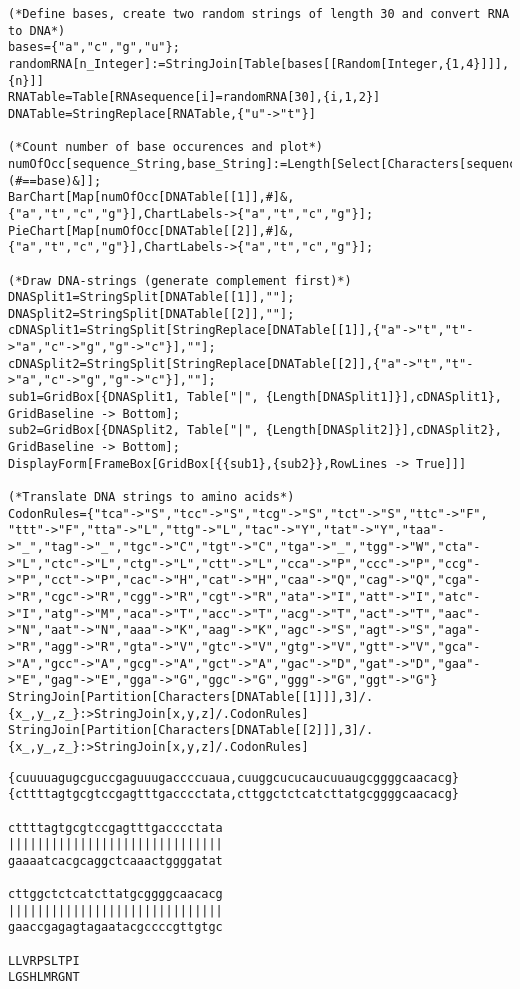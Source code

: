 \documentclass[11pt,a4paper,onecolumn]{article}
\begin{document}
\begin{lstlisting}[mathescape]
(*Define bases, create two random strings of length 30 and convert RNA to DNA*)
bases={"a","c","g","u"};
randomRNA[n_Integer]:=StringJoin[Table[bases[[Random[Integer,{1,4}]]],{n}]]
RNATable=Table[RNAsequence[i]=randomRNA[30],{i,1,2}]
DNATable=StringReplace[RNATable,{"u"->"t"}]

(*Count number of base occurences and plot*)
numOfOcc[sequence_String,base_String]:=Length[Select[Characters[sequence],(#==base)&]];
BarChart[Map[numOfOcc[DNATable[[1]],#]&,{"a","t","c","g"}],ChartLabels->{"a","t","c","g"}];
PieChart[Map[numOfOcc[DNATable[[2]],#]&,{"a","t","c","g"}],ChartLabels->{"a","t","c","g"}];

(*Draw DNA-strings (generate complement first)*)
DNASplit1=StringSplit[DNATable[[1]],""];
DNASplit2=StringSplit[DNATable[[2]],""];
cDNASplit1=StringSplit[StringReplace[DNATable[[1]],{"a"->"t","t"->"a","c"->"g","g"->"c"}],""];
cDNASplit2=StringSplit[StringReplace[DNATable[[2]],{"a"->"t","t"->"a","c"->"g","g"->"c"}],""];
sub1=GridBox[{DNASplit1, Table["|", {Length[DNASplit1]}],cDNASplit1}, GridBaseline -> Bottom];
sub2=GridBox[{DNASplit2, Table["|", {Length[DNASplit2]}],cDNASplit2}, GridBaseline -> Bottom];
DisplayForm[FrameBox[GridBox[{{sub1},{sub2}},RowLines -> True]]]

(*Translate DNA strings to amino acids*)
CodonRules={"tca"->"S","tcc"->"S","tcg"->"S","tct"->"S","ttc"->"F",   "ttt"->"F","tta"->"L","ttg"->"L","tac"->"Y","tat"->"Y","taa"->"_","tag"->"_","tgc"->"C","tgt"->"C","tga"->"_","tgg"->"W","cta"->"L","ctc"->"L","ctg"->"L","ctt"->"L","cca"->"P","ccc"->"P","ccg"->"P","cct"->"P","cac"->"H","cat"->"H","caa"->"Q","cag"->"Q","cga"->"R","cgc"->"R","cgg"->"R","cgt"->"R","ata"->"I","att"->"I","atc"->"I","atg"->"M","aca"->"T","acc"->"T","acg"->"T","act"->"T","aac"->"N","aat"->"N","aaa"->"K","aag"->"K","agc"->"S","agt"->"S","aga"->"R","agg"->"R","gta"->"V","gtc"->"V","gtg"->"V","gtt"->"V","gca"->"A","gcc"->"A","gcg"->"A","gct"->"A","gac"->"D","gat"->"D","gaa"->"E","gag"->"E","gga"->"G","ggc"->"G","ggg"->"G","ggt"->"G"}
StringJoin[Partition[Characters[DNATable[[1]]],3]/.{x_,y_,z_}:>StringJoin[x,y,z]/.CodonRules]
StringJoin[Partition[Characters[DNATable[[2]]],3]/.{x_,y_,z_}:>StringJoin[x,y,z]/.CodonRules]
\end{lstlisting}
\begin{lstlisting}[mathescape]
{cuuuuagugcguccgaguuugaccccuaua,cuuggcucucaucuuaugcggggcaacacg}
{cttttagtgcgtccgagtttgacccctata,cttggctctcatcttatgcggggcaacacg}

cttttagtgcgtccgagtttgacccctata
||||||||||||||||||||||||||||||
gaaaatcacgcaggctcaaactggggatat

cttggctctcatcttatgcggggcaacacg
||||||||||||||||||||||||||||||
gaaccgagagtagaatacgccccgttgtgc

LLVRPSLTPI
LGSHLMRGNT
\end{lstlisting}
\end{document}
